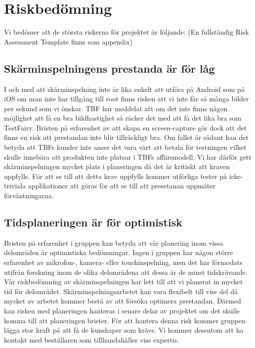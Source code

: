 \section{Riskbedömning}

Vi bedömer att de största riskerna för projektet är följande:
(En fullständig Risk Assessment Template finns som appendix)

\subsection{Skärminspelningens prestanda är för låg}
\label{subsec:screenrec}
I och med att skärminspelning inte är lika enkelt att utföra på Android som på iOS om man inte har tillgång till root finns risken att vi inte får så många bilder per sekund som vi önskar. TBF har meddelat att om det inte finns någon möjlighet att få en bra bildhastighet så räcker det med att få det lika bra som TestFairy. Bristen på erfarenhet av att skapa en screen-capture gör dock att det finns en risk att prestandan inte blir tillräckligt bra. Om fallet är sådant kan det betyda att TBFs kunder inte anser det vara värt att betala för testningen vilket skulle innebära att produkten inte platsar i TBFs affärsmodell. Vi har därför gett skärminspelningen mycket plats i planeringen då det är kritiskt att kraven uppfylls. För att se till att detta krav uppfylls kommer utförliga tester på icke-triviala applikationer att göras för att se till att presetanan uppmäter förväntningarna.

\subsection{Tidsplaneringen är för optimistisk}
Bristen på erfarenhet i gruppen kan betyda att vår planering inom vissa delområden är optimistiska bedömningar. Ingen i gruppen har någon större erfarenhet av mikrofon-, kamera- eller touchinspelning, men det har förmodats utifrån forskning inom de olika delområdena att dessa är de minst tidskrävande. Vår riskbedömning av skärminspelningen har lett till att vi planerat in mycket tid för delområdet. Skärminspelningsarbetet kan vara flexibelt till viss del då mycket av arbetet kommer bestå av att försöka optimera prestandan. Därmed kan risken med planeringen hanteras i senare delar av projektet om det skulle komma till att planeringen brister. För att hantera denna risk kommer gruppen lägga stor kraft på att få de kunskaper som krävs. Vi kommer dessutom att ha kontakt med beställaren som tillhandahåller viss expertis.

